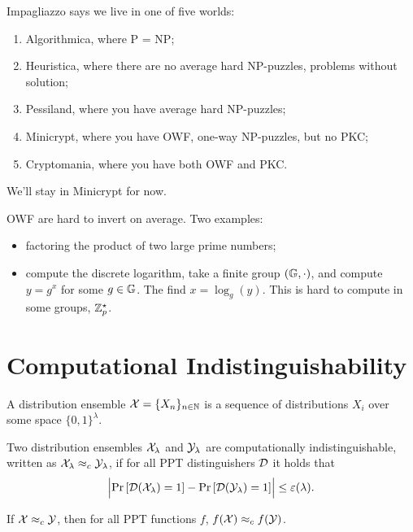 Impagliazzo says we live in one of five worlds:
\begin{enumerate}
	\item Algorithmica, where P = NP;
	\item Heuristica, where there are no average hard NP-puzzles, \ie problems without solution;
	\item Pessiland, where you have average hard NP-puzzles;
	\item Minicrypt, where you have \ac{OWF}, one-way NP-puzzles, but no \ac{PKC};
	\item Cryptomania, where you have both \ac{OWF} and \ac{PKC}.
\end{enumerate}
We'll stay in Minicrypt for now.

\ac{OWF} are hard to invert on average.
Two examples:
\begin{itemize}
	\item factoring the product of two large prime numbers;
	\item compute the discrete logarithm, \ie take a finite group $(\mathbb{G}, \cdot)$, and compute $y = g^x$ for some $g \in \mathbb{G}$.
	The find $x = \log_{g}(y)$.
	This is hard to compute in some groups, \eg $\mathbb{Z}^{\star}_{p}$.
\end{itemize}

\section{Computational Indistinguishability}

\begin{definition}
	A distribution ensemble $\mathcal{X} = \{ X_n \}_{n \in \mathbb{N}}$ is a sequence of distributions $X_i$ over some space $\{0,1\}^{\lambda}$.
\end{definition}

\begin{definition}
	Two distribution ensembles $\mathcal{X}_{\lambda}$ and $\mathcal{Y}_{\lambda}$ are computationally indistinguishable, written as $\mathcal{X}_{\lambda} \approx_c \mathcal{Y}_{\lambda}$, if for all \ac{PPT} distinguishers $\mathcal{D}$ it holds that
	\begin{equation*}
		\left|{\mathop{\mathrm{Pr}}\limits_{} \left[ {\mathcal{D}(\mathcal{X}_{\lambda}) = 1} \right] - \mathop{\mathrm{Pr}}\limits_{} \left[ {\mathcal{D}(\mathcal{Y}_{\lambda}) = 1} \right]}\right| \le \varepsilon(\lambda).
	\end{equation*}
\end{definition}

\begin{lemma}[Reduction] \label{lem:reduction}
	If $\mathcal{X} \approx_c \mathcal{Y}$, then for all \ac{PPT} functions $f$, $f(\mathcal{X}) \approx_c f(\mathcal{Y})$.
\end{lemma}


